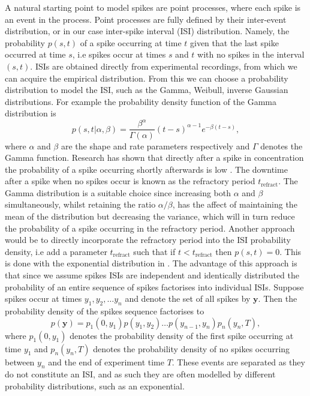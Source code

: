 \documentclass[../main.tex]{subfiles}
\begin{document}
A natural starting point to model  spikes are point processes, where each spike is an event in the process. Point processes are fully defined by their inter-event distribution, or in our case inter-spike interval (ISI) distribution. Namely, the probability $p(s,t)$ of a spike occurring at time $t$ given that the last spike occurred at time $s$, i.e spikes occur at times $s$ and $t$ with no spikes in the interval $(s,t)$. ISIs are obtained directly from experimental recordings, from which we can acquire the empirical distribution. From this we can choose a probability distribution to model the ISI, such as the Gamma, Weibull, inverse Gaussian distributions.  For example the probability density function of the Gamma distribution is
\begin{equation}\label{eq:1}
p(s, t | \alpha, \beta) = \frac{\beta^\alpha}{\Gamma(\alpha)} (t-s)^{\alpha-1} e^{-\beta (t-s)}, 
\end{equation}
where $\alpha$ and $\beta$ are the shape and rate parameters respectively and $\Gamma$ denotes the Gamma function. Research has shown that directly after a spike in  concentration the probability of a spike occurring shortly afterwards is low \cite{Thurley_2011}. The downtime after a spike when no spikes occur is known as the refractory period $t_{\mathrm{refract}}$.   The Gamma distribution is a suitable choice since increasing both $\alpha$ and $\beta$ simultaneously, whilst retaining the ratio $\alpha / \beta$, has the affect of maintaining the mean of the distribution but decreasing the variance, which will in turn reduce the probability of a spike occurring in the refractory period. Another approach would be to directly incorporate the refractory period into the ISI probability density, i.e add a parameter $t_{\mathrm{refract}}$ such that if $t < t_{\mathrm{refract}}$ then $p(s,t) = 0.$ This is done with the exponential distribution in \cite{Skupin}. The advantage of this approach is that since we assume spikes ISIs are independent and identically distributed the probability of an entire sequence of spikes factorises into individual ISIs. Suppose  spikes occur at times $y_1, y_2, \dots y_n$ and denote the set of all spikes by $\mathbf{y}$. Then the probability density of the spikes sequence factorises to
\begin{equation}\label{eq:2}
p(\mathbf{y}) = p_1(0,y_1)p(y_1,y_2) \dots p(y_{n-1},y_{n}) p_n(y_n,T),
\end{equation}
where $p_1(0,y_1)$ denotes the probability density of the first spike occurring at time  $y_1$ and $p_n(y_n,T)$ denotes the probability density of no spikes occurring between $y_n$ and the end of experiment time $T$. These events are separated as they do not constitute an ISI, and as such they are often modelled by different probability distributions, such as an exponential. 
\end{document}
